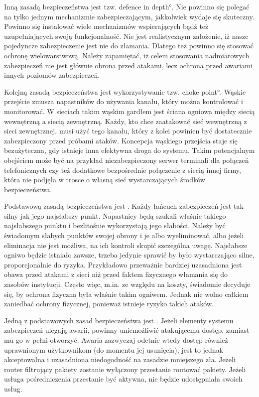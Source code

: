 Inną zasadą bezpieczeństwa jest tzw.  \ang{defence in
depth}. Nie powinno się polegać na tylko jednym mechanizmie
zabezpieczającym, jakkolwiek wydaje się skuteczny. Powinno się instalować
wiele mechanizmów wspierających bądź też uzupełniających swoją
funkcjonalność. Nie jest realistycznym założenie, iż nasze pojedyncze
zabezpieczenie jest nie do złamania. Dlatego też powinno się stosować
ochronę wielowarstwową. Należy zapamiętać, iż celem stosowania nadmiarowych
zabezpieczeń nie jest głównie obrona przed atakami, lecz ochrona przed
awariami innych poziomów zabezpieczeń.

Kolejną zasadą bezpieczeństwa jest wykorzystywanie tzw.  \ang{choke point}. Wąskie przejście zmusza napastników do
używania kanału, który można kontrolować i monitorować. W sieciach takim
wąskim gardłem jest ściana ogniowa między siecią wewnętrzną a siecią
zewnętrzną. Każdy, kto chce zaatakować sieć wewnętrzną z sieci zewnętrznej,
musi użyć tego kanału, który z kolei powinien być dostatecznie zabezpieczony
przed próbami ataków. Koncepcja wąskiego przejścia staje się bezużyteczna,
gdy istnieje inna efektywna droga do systemu. Takim potencjalnym obejściem
może być na przykład niezabezpieczony serwer terminali dla połączeń
telefonicznych czy też dodatkowe bezpośrednie połączenie z siecią innej
firmy, która nie podjęła w trosce o własną sieć wystarczających środków
bezpieczeństwa.

Podstawową zasadą bezpieczeństwa jest . Każdy
łańcuch zabezpieczeń jest tak silny jak jego najsłabszy punkt. Napastnicy
będą szukali właśnie takiego najsłabszego punktu i bezlitośnie wykorzystają
jego słabości. Należy być świadomym słabych punktów swojej obrony i je albo
wyeliminować, albo jeżeli eliminacja nie jest możliwa, na ich kontroli
skupić szczególna uwagę. Najsłabsze ogniwo będzie istniało zawsze, trzeba
jedynie sprawić by było wystarczająco silne, proporcjonalnie do ryzyka.
Przykładowo przeważnie bardziej uzasadniona jest obawa przed atakami z sieci
niż przed faktem fizycznego włamania się do zasobów instytucji. Często więc,
m.in. ze względu na koszty, świadomie decyduje się, by ochrona fizyczna była
właśnie takim ogniwem. Jednak nie wolno całkiem zaniedbać ochrony fizycznej,
ponieważ istnieje ryzyko takich ataków.

Jedną z podstawowych zasad bezpieczeństwa jest . Jeżeli elementy systemu zabezpieczeń ulegają awarii,
powinny uniemożliwić atakującemu dostęp, zamiast mu go w pełni otworzyć.
Awaria zazwyczaj odetnie wtedy dostęp również uprawnionym użytkownikom (do
momentu jej usunięcia), jest to jednak akceptowalna i uzasadniona
niedogodność na zasadzie mniejszego zła. Jeżeli router filtrujący pakiety
zostanie wyłączony przestanie routować pakiety. Jeżeli usługa pośredniczenia
przestanie być aktywna, nie będzie udostępniała swoich usług.

